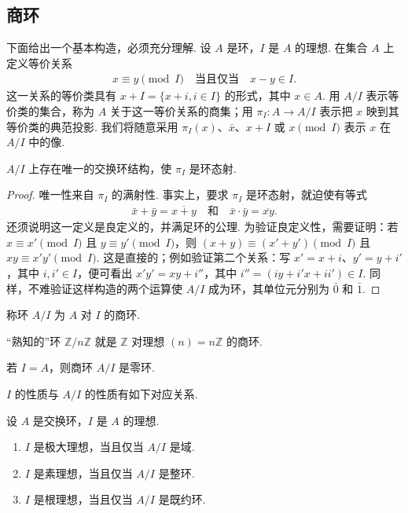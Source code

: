 \subsection{商环}\label{sec:galois-1-2-10}
下面给出一个基本构造，必须充分理解. 设 $A$ 是环，$I$ 是 $A$ 的理想. 在集合 $A$ 上定义等价关系
\begin{align*}
x\equiv y\pmod I\quad\text{当且仅当}\quad x-y\in I.
\end{align*}
这一关系的等价类具有 $x+I=\{x+i,i\in I\}$ 的形式，其中 $x\in A$. 用 $A/I$ 表示等价类的集合，称为 $A$ 关于这一等价关系的商集；用 $\pi_I\colon A\longrightarrow A/I$ 表示把 $x$ 映到其等价类的典范投影. 我们将随意采用 $\pi_I(x)$、$\bar x$、$x+I$ 或 $x\pmod I$ 表示 $x$ 在 $A/I$ 中的像.
\begin{proposition*}
$A/I$ 上存在唯一的交换环结构，使 $\pi_I$ 是环态射.
\end{proposition*}
\begin{proof}
唯一性来自 $\pi_I$ 的满射性. 事实上，要求 $\pi_I$ 是环态射，就迫使有等式
\begin{align*}
\bar x+\bar y=\overline{x+y}\quad\text{和}\quad\bar x\cdot\bar y=\overline{xy}.
\end{align*}
还须说明这一定义是良定义的，并满足环的公理. 为验证良定义性，需要证明：若 $x\equiv x'\pmod I$ 且 $y\equiv y'\pmod I$，则 $(x+y)\equiv(x'+y')\pmod I$ 且 $xy\equiv x'y'\pmod I$. 这是直接的；例如验证第二个关系：写 $x'=x+i$、$y'=y+i'$，其中 $i,i'\in I$，便可看出 $x'y'=xy+i''$，其中 $i''=(iy+i'x+ii')\in I$.
同样，不难验证这样构造的两个运算使 $A/I$ 成为环，其单位元分别为 $\bar0$ 和 $\bar1$.
\end{proof}
称环 $A/I$ 为 $A$ 对 $I$ 的商环.
\begin{example*}
``熟知的''环 $\mathbb Z/n\mathbb Z$ 就是 $\mathbb Z$ 对理想 $(n)=n\mathbb Z$ 的商环.
\end{example*}
\begin{example*}
若 $I=A$，则商环 $A/I$ 是零环.
\end{example*}
$I$ 的性质与 $A/I$ 的性质有如下对应关系.
\begin{proposition*}
设 $A$ 是交换环，$I$ 是 $A$ 的理想.
\begin{enumerate}
\item[i)] $I$ 是极大理想，当且仅当 $A/I$ 是域.
\item[ii)] $I$ 是素理想，当且仅当 $A/I$ 是整环.
\item[iii)] $I$ 是根理想，当且仅当 $A/I$ 是既约环.
\end{enumerate}
\end{proposition*}
